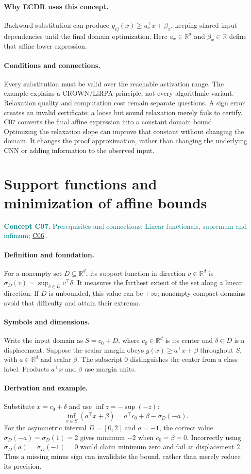\documentclass[11pt,a4paper]{article}
\newcommand{\R}{\mathbb R}
\newcommand{\conceptid}{Front matter}
\newcommand{\concept}[3]{\clearpage\renewcommand{\conceptid}{#1}%
\section{#2}\label{concept:#1}%
\textcolor{teal}{\textbf{Concept #1.} Prerequisites and connections: #3.}\par
\typeout{ECDR-CONCEPT-START #1 PAGE=\thepage}}
\begin{document}
\paragraph{Why ECDR uses this concept.}
Backward substitution can produce $g_{cj}(x)\ge a_x^\top x+\beta_x$, keeping shared input dependencies until the final domain optimization. Here $a_x\in\R^d$ and $\beta_x\in\R$ define that affine lower expression.
\paragraph{Conditions and connections.}
Every substitution must be valid over the reachable activation range. The example explains a CROWN/LiRPA principle, not every algorithmic variant. Relaxation quality and computation cost remain separate questions. A sign error creates an invalid certificate; a loose but sound relaxation merely fails to certify. \hyperref[concept:C07]{C07} converts the final affine expression into a constant domain bound. Optimizing the relaxation slope can improve that constant without changing the domain. It changes the proof approximation, rather than changing the underlying CNN or adding information to the observed input.
\par\label{endconcept:C06}

\concept{C07}{Support functions and minimization of affine bounds}{Linear functionals, supremum and infimum; \hyperref[concept:C06]{C06}.}
\paragraph{Definition and foundation.}
For a nonempty set $D\subseteq\R^d$, its support function in direction $v\in\R^d$ is $\sigma_D(v)=\sup_{\delta\in D}v^\top\delta$. It measures the farthest extent of the set along a linear direction. If $D$ is unbounded, this value can be $+\infty$; nonempty compact domains avoid that difficulty and attain their extrema.
\paragraph{Symbols and dimensions.}
Write the input domain as $S=c_0+D$, where $c_0\in\R^d$ is its center and $\delta\in D$ is a displacement. Suppose the scalar margin obeys $g(x)\ge a^\top x+\beta$ throughout $S$, with $a\in\R^d$ and scalar $\beta$. The subscript 0 distinguishes the center from a class label. Products $a^\top x$ and $\beta$ use margin units.
\paragraph{Derivation and example.}
Substitute $x=c_0+\delta$ and use $\inf z=-\sup(-z)$:
\[
 \inf_{x\in S}(a^\top x+\beta)
 =a^\top c_0+\beta-\sigma_D(-a).
\]
For the asymmetric interval $D=[0,2]$ and $a=-1$, the correct value $\sigma_D(-a)=\sigma_D(1)=2$ gives minimum $-2$ when $c_0=\beta=0$. Incorrectly using $\sigma_D(a)=\sigma_D(-1)=0$ would claim minimum zero and fail at displacement 2. Thus a missing minus sign can invalidate the bound, rather than merely reduce its precision.
\end{document}
